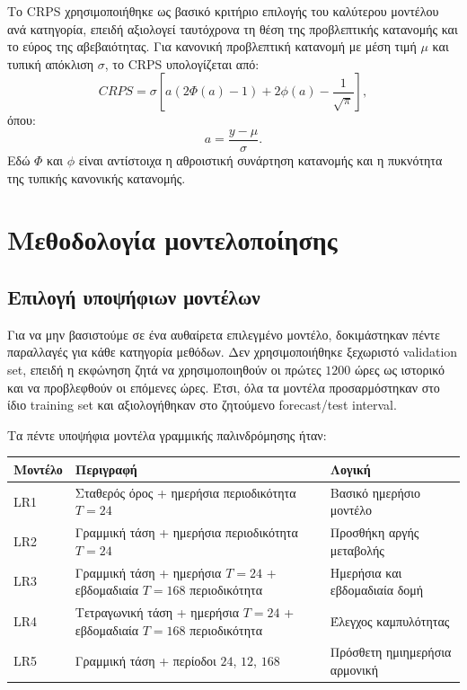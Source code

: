\documentclass{article}
\begin{document}
Το CRPS χρησιμοποιήθηκε ως βασικό κριτήριο επιλογής του καλύτερου μοντέλου ανά κατηγορία, επειδή αξιολογεί ταυτόχρονα τη θέση της προβλεπτικής κατανομής και το εύρος της αβεβαιότητας. Για κανονική προβλεπτική κατανομή με μέση τιμή $\mu$ και τυπική απόκλιση $\sigma$, το CRPS υπολογίζεται από:
\[
CRPS = \sigma\left[
a(2\Phi(a)-1)+2\phi(a)-\frac{1}{\sqrt{\pi}}
\right],
\]
όπου:
\[
a = \frac{y-\mu}{\sigma}.
\]
Εδώ $\Phi$ και $\phi$ είναι αντίστοιχα η αθροιστική συνάρτηση κατανομής και η πυκνότητα της τυπικής κανονικής κατανομής.

\section{Μεθοδολογία μοντελοποίησης}

\subsection{Επιλογή υποψήφιων μοντέλων}

Για να μην βασιστούμε σε ένα αυθαίρετα επιλεγμένο μοντέλο, δοκιμάστηκαν πέντε παραλλαγές για κάθε κατηγορία μεθόδων. Δεν χρησιμοποιήθηκε ξεχωριστό validation set, επειδή η εκφώνηση ζητά να χρησιμοποιηθούν οι πρώτες $1200$ ώρες ως ιστορικό και να προβλεφθούν οι επόμενες ώρες. Έτσι, όλα τα μοντέλα προσαρμόστηκαν στο ίδιο training set και αξιολογήθηκαν στο ζητούμενο forecast/test interval.

Τα πέντε υποψήφια μοντέλα γραμμικής παλινδρόμησης ήταν:

\begin{center}
\begin{tabular}{|P{2.4cm}|P{10.5cm}|P{3.2cm}|}
\hline
\textbf{Μοντέλο} & \textbf{Περιγραφή} & \textbf{Λογική} \\
\hline
LR1 & Σταθερός όρος + ημερήσια περιοδικότητα $T=24$ & Βασικό ημερήσιο μοντέλο \\
\hline
LR2 & Γραμμική τάση + ημερήσια περιοδικότητα $T=24$ & Προσθήκη αργής μεταβολής \\
\hline
LR3 & Γραμμική τάση + ημερήσια $T=24$ + εβδομαδιαία $T=168$ περιοδικότητα & Ημερήσια και εβδομαδιαία δομή \\
\hline
LR4 & Τετραγωνική τάση + ημερήσια $T=24$ + εβδομαδιαία $T=168$ περιοδικότητα & Έλεγχος καμπυλότητας \\
\hline
LR5 & Γραμμική τάση + περίοδοι $24$, $12$, $168$ & Πρόσθετη ημιημερήσια αρμονική \\
\hline
\end{tabular}
\end{center}
\end{document}
